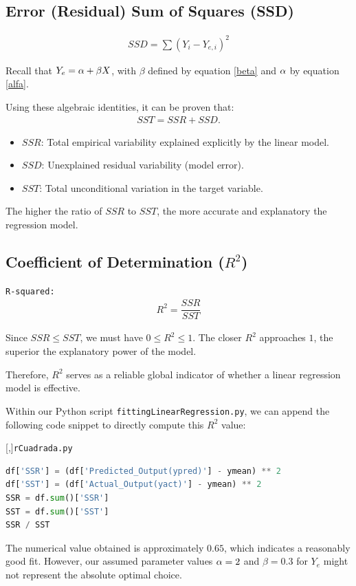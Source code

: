 \subsection{Error (Residual) Sum of Squares (SSD)}
\begin{align}
	SSD = \sum \left( Y_i - Y_{e,i} \right)^2
\end{align}

Recall that $Y_e = \alpha + \beta X$, with $\beta$ defined by equation \eqref{beta} and $\alpha$ by equation \eqref{alfa}.

Using these algebraic identities, it can be proven that:
\begin{align}
	SST = SSR + SSD.
\end{align}

\begin{itemize}
	\item $SSR$: Total empirical variability explained explicitly by the linear model.
	\item $SSD$: Unexplained residual variability (model error).
	\item $SST$: Total unconditional variation in the target variable.
\end{itemize}

\begin{observacion}
	The higher the ratio of $SSR$ to $SST$, the more accurate and explanatory the regression model.
\end{observacion}

\subsection{Coefficient of Determination ($R^2$)}
\texttt{R-squared: }
\begin{align}
	R^2 = \dfrac{SSR}{SST}
\end{align}

Since $SSR \leq SST$, we must have $0 \leq R^2 \leq 1$. The closer $R^2$ approaches $1$, the superior the explanatory power of the model.

Therefore, $R^2$ serves as a reliable global indicator of whether a linear regression model is effective.

Within our Python script \texttt{fittingLinearRegression.py}, we can append the following code snippet to directly compute this $R^2$ value:

[,]{\texttt{rCuadrada.py}}
\begin{lstlisting}[language=Python]
df['SSR'] = (df['Predicted_Output(ypred)'] - ymean) ** 2
df['SST'] = (df['Actual_Output(yact)'] - ymean) ** 2
SSR = df.sum()['SSR']
SST = df.sum()['SST']
SSR / SST
\end{lstlisting}

The numerical value obtained is approximately $0.65$, which indicates a reasonably good fit. However, our assumed parameter values $\alpha = 2$ and $\beta = 0.3$ for $Y_e$ might not represent the absolute optimal choice.
